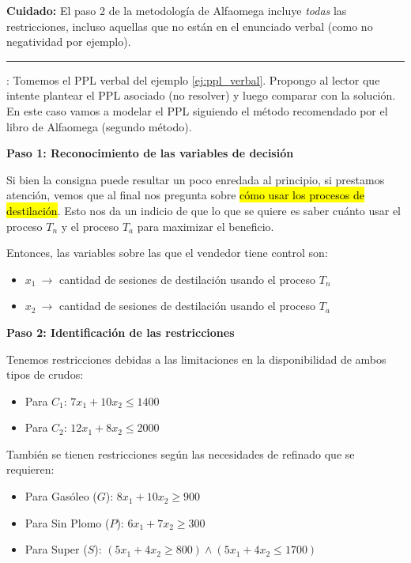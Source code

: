 \begin{tcolorbox}[mydanger]
  \textbf{Cuidado:} El paso 2 de la metodología de Alfaomega incluye \textit{todas} las restricciones, incluso aquellas que no están en el enunciado verbal (como no negatividad por ejemplo).
\end{tcolorbox}

\vspace{5mm}
\hrule
\vspace{5mm}

\ejemplo\label{ej:modelo_de_ppl_verbal}: Tomemos el PPL verbal del ejemplo \ref{ej:ppl_verbal}. Propongo al lector que intente plantear el PPL asociado (no resolver) y luego comparar con la solución. En este caso vamos a modelar el PPL siguiendo el método recomendado por el libro de Alfaomega (segundo método).

\noindent\textbf{Paso 1: Reconocimiento de las variables de decisión}

Si bien la consigna puede resultar un poco enredada al principio, si prestamos atención, vemos que al final nos pregunta sobre \hl{cómo usar los procesos de destilación}. Esto nos da un indicio de que lo que se quiere es saber cuánto usar el proceso \(T_n\) y el proceso \(T_a\) para maximizar el beneficio.

Entonces, las variables sobre las que el vendedor tiene control son:
\begin{itemize}
  \item \(x_1 ~\rightarrow\) cantidad de sesiones de destilación usando el proceso \(T_n\)
  \item \(x_2 ~\rightarrow\) cantidad de sesiones de destilación usando el proceso \(T_a\)
\end{itemize}

\noindent\textbf{Paso 2: Identificación de las restricciones}

Tenemos restricciones debidas a las limitaciones en la disponibilidad de ambos tipos de crudos:
\begin{itemize}
  \item Para \(C_1\): \(7x_1 + 10x_2 \leq 1400\)
  \item Para \(C_2\): \(12x_1 + 8x_2 \leq 2000\)
\end{itemize}

\noindent También se tienen restricciones según las necesidades de refinado que se requieren:
\begin{itemize}
  \item Para Gasóleo (\(G\)): \(8x_1 + 10x_2 \geq 900\)
  \item Para Sin Plomo (\(P\)): \(6x_1 + 7x_2 \geq 300\)
  \item Para Super (\(S\)): \((5x_1 + 4x_2 \geq 800) \wedge (5x_1 + 4x_2 \leq 1700)\)
\end{itemize}

